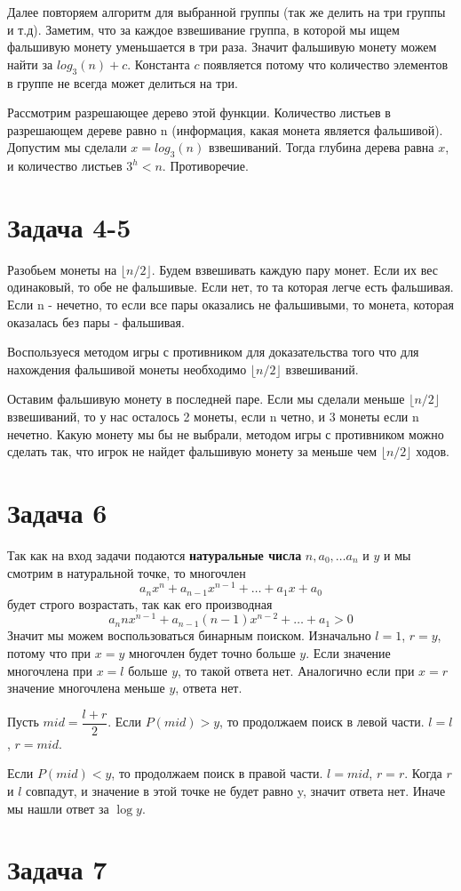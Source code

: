 \documentclass{article}
\begin{document}
Далее повторяем алгоритм для выбранной группы (так же делить на три группы и т.д). Заметим, что за каждое взвешивание группа, в которой мы ищем фальшивую монету уменьшается в три раза. Значит фальшивую монету можем найти за $log_3(n) + c$. Константа $c$ появляется потому что количество элементов в группе не всегда может делиться на три.

Рассмотрим разрешающее дерево этой функции. Количество листьев в разрешающем дереве равно n (информация, какая монета является фальшивой). Допустим мы сделали $x = log_3(n)$ взвешиваний. Тогда глубина дерева равна $x$, и количество листьев $3 ^ h < n$. Противоречие.

\section*{Задача 4-5}

Разобьем монеты на $\lfloor n/2\rfloor$. Будем взвешивать каждую пару монет. Если их вес одинаковый, то обе не фальшивые. Если нет, то та которая легче есть фальшивая. Если n - нечетно, то если все пары оказались не фальшивыми, то монета, которая оказалась без пары - фальшивая.

Воспользуеся методом игры с противником для доказательства того что для нахождения фальшивой монеты необходимо $\lfloor n/2\rfloor$ взвешиваний.

Оставим фальшивую монету в последней паре. Если мы сделали меньше $\lfloor n/2\rfloor$ взвешиваний, то у нас осталось 2 монеты, если n четно, и 3 монеты если n нечетно. Какую монету мы бы не выбрали, методом игры с противником можно сделать так, что игрок не найдет фальшивую монету за меньше чем $\lfloor n/2\rfloor$ ходов. 


\newpage
\section*{Задача 6}

Так как на вход задачи подаются \textbf{натуральные числа} $n, a_0, \ldots a_n$ и $y$ и мы смотрим в натуральной точке, то многочлен 
\[ a_n x^n + a_{n-1} x^{n-1} + \ldots + a_1x +  a_0 \] 
будет строго возрастать, так как его производная 
\[ a_n n x^{n - 1} + a_{n-1} (n - 1) x^{n-2} + \ldots + a_1 > 0 \] 
Значит мы можем воспользоваться бинарным поиском. Изначально $ l = 1 $, $ r = y$, потому что при $x = y$ многочлен будет точно больше $y$. Если значение многочлена при $x = l$ больше $y$, то такой ответа нет. Аналогично если при $x = r$ значение многочлена меньше $y$, ответа нет.

Пусть $mid = \dfrac{l + r}{2}$. Если $P(mid) > y$, то продолжаем поиск в левой части. $l = l$, $r = mid$. 

Если $P(mid) < y$, то продолжаем поиск в правой части. $l = mid$, $r = r$. Когда $r$ и $l$ совпадут, и значение в этой точке не будет равно y, значит ответа нет. Иначе мы нашли ответ за $\log y$. 

\section*{Задача 7}
\end{document}
